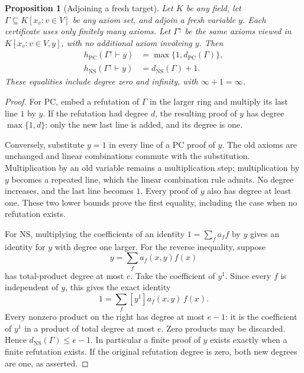 \documentclass[11pt,a4paper,oneside,openany]{book}
\newtheorem{proposition}[theorem]{Proposition}
\theoremstyle{definition}\newtheorem{definition}[theorem]{Definition}
\theoremstyle{remark}\newtheorem{remark}[theorem]{Remark}
\newcommand{\NS}{\mathrm{NS}}\newcommand{\PC}{\mathrm{PC}}
\numberwithin{equation}{chapter}
\begin{document}
\begin{proposition}[Adjoining a fresh target]\label{tx:prop:fresh-target}
Let $K$ be any field, let $\Gamma\subseteq K[x_v:v\in V]$ be any axiom
set, and adjoin a fresh variable $y$. Each certificate uses only
finitely many axioms. Let $\Gamma^\uparrow$ be the same axioms viewed
in $K[x_v:v\in V,y]$, with no additional axiom involving $y$. Then
\begin{equation}\label{tx:eq:fresh-identities}
 \begin{aligned}
 h_{\PC}(\Gamma^\uparrow\vdash y)
       &=\max\{1,d_{\PC}(\Gamma)\},\\
 h_{\NS}(\Gamma^\uparrow\vdash y)
       &=d_{\NS}(\Gamma)+1.
 \end{aligned}
\end{equation}
These equalities include degree zero and infinity, with
$\infty+1=\infty$.
\end{proposition}
\begin{proof}
For PC, embed a refutation of $\Gamma$ in the larger ring and multiply
its last line $1$ by $y$. If the refutation had degree $d$, the resulting
proof of $y$ has degree $\max\{1,d\}$: only the new last line is added,
and its degree is one.

Conversely, substitute $y=1$ in every line of a PC proof of $y$.
The old axioms are unchanged and linear combinations commute with the
substitution. Multiplication by an old variable remains a multiplication
step; multiplication by $y$ becomes a repeated line, which the linear
combination rule admits. No degree increases, and the last line becomes
$1$. Every proof of $y$ also has degree at least one. These two lower
bounds prove the first equality, including the case when no refutation
exists.

For NS, multiplying the coefficients of an identity
$1=\sum_fa_ff$ by $y$ gives an identity for $y$ with degree one larger.
For the reverse inequality, suppose
\[
                    y=\sum_f a_f(x,y)f(x)
\]
has total-product degree at most $e$. Take the coefficient of $y^1$.
Since every $f$ is independent of $y$, this gives the exact identity
\[
                    1=\sum_f [y^1]a_f(x,y)\,f(x).
\]
Every nonzero product on the right has degree at most $e-1$: it is the
coefficient of $y^1$ in a product of total degree at most $e$. Zero
products may be discarded. Hence $d_{\NS}(\Gamma)\le e-1$.
In particular a finite proof of $y$ exists exactly when a finite
refutation exists. If the original refutation degree is zero, both
new degrees are one, as asserted.
\end{proof}
\end{document}
